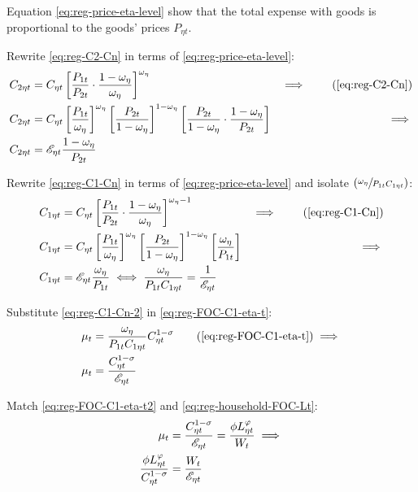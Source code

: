 \documentclass[
thesis.tex
]{subfiles}
\begin{document}
Equation \ref{eq:reg-price-eta-level} show that the total expense with goods is proportional to the goods' prices $P_{\eta t}$.

Rewrite \ref{eq:reg-C2-Cn} in terms of \ref{eq:reg-price-eta-level}:
\begin{alignat}{2}
	C_{2\eta t} &= C_{\eta t} \left[ \frac{P_{1t} }{P_{2t}} \cdot \frac{1 -\omega_{\eta}}{\omega_{\eta}} \right]^{\omega_{\eta}} &\implies \tag{\ref{eq:reg-C2-Cn}} \\
	C_{2\eta t} &= C_{\eta t} \left[ \frac{P_{1t}}{\omega_{\eta}} \right]^{\omega_{\eta}} \left[ \frac{P_{2t}}{1 -\omega_{\eta}} \right]^{1 -\omega_{\eta}} \left[ \frac{P_{2t}}{1 -\omega_{\eta}} \cdot \frac{1 -\omega_{\eta}}{P_{2t}} \right] &\implies \nonumber \\
	C_{2\eta t} &= \te \frac{1 -\omega_{\eta}}{P_{2t}} \label{eq:reg-C2-Cn-2}
\end{alignat}

Rewrite \ref{eq:reg-C1-Cn} in terms of \ref{eq:reg-price-eta-level} and isolate $(\sfrac{\omega_{\eta}}{P_{1t} C_{1\eta t}})$:
	\begin{alignat}{2}
		C_{1\eta t} &= C_{\eta t} \left[ \frac{P_{1t}}{P_{2t}} \cdot \frac{1 -\omega_{\eta}}{\omega_{\eta}} \right]^{\omega_{\eta} -1} &\implies \tag{\ref{eq:reg-C1-Cn}} \\
		C_{1\eta t} &= C_{\eta t} \left[ \frac{ P_{1t} }{ \omega_{\eta} }\right]^{ \omega_{\eta} } \left[ \frac{P_{2t}}{1-\omega_{\eta}} \right]^{1 -\omega_{\eta}} \left[ \frac{\omega_{\eta}}{P_{1t}} \right] &\implies \nonumber \\
		C_{1\eta t} &= \te \frac{\omega_{\eta}}{P_{1t}} \iff
		\frac{\omega_{\eta}}{P_{1t} C_{1\eta t}} = \frac{1}{\te} \label{eq:reg-C1-Cn-2}
	\end{alignat}

Substitute \ref{eq:reg-C1-Cn-2} in \ref{eq:reg-FOC-C1-eta-t}:
\begin{align}
	\mu_t &= \frac{\omega_{\eta}}{P_{1t} C_{1\eta t}} C_{\eta t}^{1 -\sigma} \tag{\ref{eq:reg-FOC-C1-eta-t}} \implies \\
	\mu_t &= \frac{ C_{\eta t}^{1-\sigma} }{ \te }  \label{eq:reg-FOC-C1-eta-t2}
\end{align}

Match \ref{eq:reg-FOC-C1-eta-t2} and \ref{eq:reg-household-FOC-Lt}:
\begin{align}
	\mu_t &= \frac{ C_{\eta t}^{1-\sigma} }{ {\mathscr{E}_{\eta t}} } = \frac{\phi L_{\eta t}^{\varphi}}{W_t} \implies \nonumber \\
	\frac{\phi L_{\eta t}^{\varphi}}{C_{\eta t}^{1-\sigma}} &= \frac{W_t}{{\mathscr{E}_{\eta t}}} \label{eq:reg-labor-supply}
\end{align}
\end{document}

